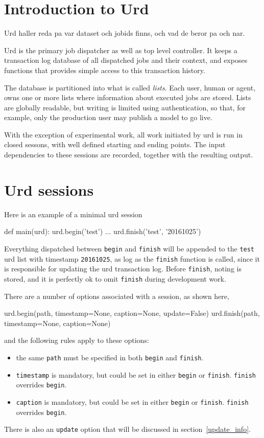 \section{Introduction to Urd}

Urd haller reda pa var dataset och jobids finns, och vad de beror pa
och nar.


Urd is the primary job dispatcher as well as top level controller.  It
keeps a transaction log database of all dispatched jobs and their
context, and exposes functions that provides simple access to this
transaction history.

The database is partitioned into what is called \textsl{lists}.  Each
user, human or agent, owns one or more lists where information about
executed jobs are stored.  Lists are globally readable, but writing is
limited using authentication, so that, for example, only the
production user may publish a model to go live.

With the exception of experimental work, all work initiated by urd is
run in closed sessons, with well defined starting and ending points.
The input dependencies to these sessions are recorded, together with
the resulting output.




\section{Urd sessions}

Here is an example of a minimal urd session\\
\begin{python}
def main(urd):
  urd.begin('test')
  ...
  urd.finish('test', '20161025')
\end{python}
Everything dispatched between \texttt{begin} and \texttt{finish} will
be appended to the \texttt{test} urd list with timestamp
\texttt{20161025}, as log as the \texttt{finish} function is called,
since it is responsible for updating the urd transaction log.  Before
\texttt{finish}, noting is stored, and it is perfectly ok to omit
\texttt{finish} during development work.

There are a number of options associated with a session, as shown here,\\
\begin{python}
  urd.begin(path, timestamp=None, caption=None, update=False)
  urd.finish(path, timestamp=None, caption=None)
\end{python}
and the following rules apply to these options:
\begin{itemize}
  \item the same \texttt{path} must be specified in both \texttt{begin} and \texttt{finish}.
  \item \texttt{timestamp} is mandatory, but could be set in either \texttt{begin} or
    \texttt{finish}.  \texttt{finish} overrides \texttt{begin}.
  \item \texttt{caption} is mandatory, but could be set in either \texttt{begin} or
    \texttt{finish}.  \texttt{finish} overrides \texttt{begin}.
\end{itemize}
There is also an \texttt{update} option that will be discussed in
section~\ref{update_info}.




